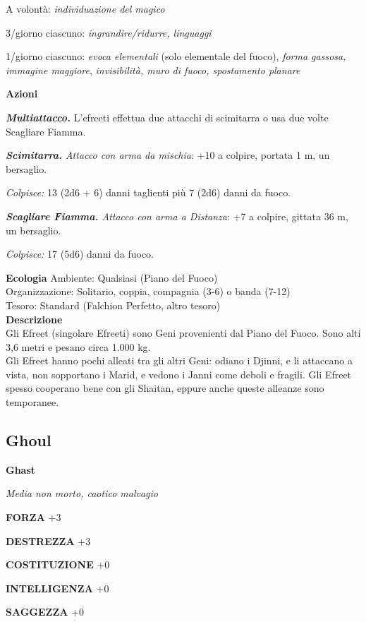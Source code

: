 \begin{multicols}{2}
A volontà: \emph{individuazione del magico}

3/giorno ciascuno: \emph{ingrandire/ridurre, linguaggi}

1/giorno ciascuno: \emph{evoca elementali} (solo elementale del fuoco), \emph{forma gassosa, immagine maggiore}, \emph{invisibilità, muro di fuoco, spostamento planare}

\textbf{Azioni}

\emph{\textbf{Multiattacco.}} L'efreeti effettua due attacchi di scimitarra o usa due volte Scagliare Fiamma.

\emph{\textbf{Scimitarra.} Attacco con arma da mischia}: +10 a colpire, portata 1 m, un bersaglio.

\emph{Colpisce:} 13 (2d6 + 6) danni taglienti più 7 (2d6) danni da fuoco.

\emph{\textbf{Scagliare Fiamma.} Attacco con arma a Distanza}: +7 a colpire, gittata 36 m, un bersaglio.

\emph{Colpisce:} 17 (5d6) danni da fuoco.

\textbf{Ecologia}
Ambiente: Qualsiasi (Piano del Fuoco)\\
Organizzazione: Solitario, coppia, compagnia (3-6) o banda (7-12)\\
Tesoro: Standard (Falchion Perfetto, altro tesoro)\\
\textbf{Descrizione}\\
Gli Efreet (singolare Efreeti) sono Geni provenienti dal Piano del Fuoco. Sono alti 3,6 metri e pesano circa 1.000 kg.\\
Gli Efreet hanno pochi alleati tra gli altri Geni: odiano i Djinni, e li attaccano a vista, non sopportano i Marid, e vedono i Janni come deboli e fragili. Gli Efreet spesso cooperano bene con gli Shaitan, eppure anche queste alleanze sono temporanee.\\


\subsection{Ghoul}

\medskip{}\textbf{Ghast}

\emph{Media non morto, caotico malvagio}

\textbf{FORZA} +3

\textbf{DESTREZZA} +3

\textbf{COSTITUZIONE} +0

\textbf{INTELLIGENZA} +0

\textbf{SAGGEZZA} +0


\end{multicols}
